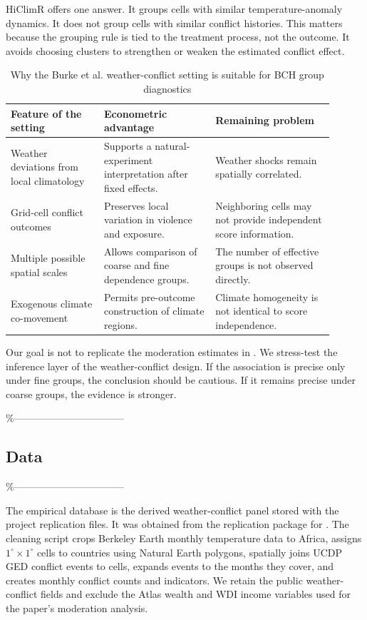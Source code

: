 \documentclass[
]{article}
\begin{document}
HiClimR offers one answer. It groups cells with similar
temperature-anomaly dynamics. It does not group cells with similar
conflict histories. This matters because the grouping rule is tied to
the treatment process, not the outcome. It avoids choosing clusters to
strengthen or weaken the estimated conflict effect.

\begin{table}[H]
\centering
\caption{Why the Burke et al. weather-conflict setting is suitable for BCH group diagnostics}
\label{tab:hbm-grouping}
\begin{tabular}{p{0.26\linewidth}p{0.31\linewidth}p{0.33\linewidth}}
\toprule
Feature of the setting & Econometric advantage & Remaining problem\\
\midrule
Weather deviations from local climatology & Supports a natural-experiment interpretation after fixed effects. & Weather shocks remain spatially correlated.\\
Grid-cell conflict outcomes & Preserves local variation in violence and exposure. & Neighboring cells may not provide independent score information.\\
Multiple possible spatial scales & Allows comparison of coarse and fine dependence groups. & The number of effective groups is not observed directly.\\
Exogenous climate co-movement & Permits pre-outcome construction of climate regions. & Climate homogeneity is not identical to score independence.\\
\bottomrule
\end{tabular}
\end{table}

Our goal is not to replicate the moderation estimates in
\citet{burke2024}. We stress-test the inference layer of the
weather-conflict design. If the association is precise only under fine
groups, the conclusion should be cautious. If it remains precise under
coarse groups, the evidence is stronger.

\%---------------------------------

\subsection{Data}

\%---------------------------------

The empirical database is the derived weather-conflict panel stored with
the project replication files. It was obtained from the replication
package for \citet{burke2024}. The cleaning script crops Berkeley Earth
monthly temperature data to Africa, assigns \(1^\circ\times1^\circ\)
cells to countries using Natural Earth polygons, spatially joins UCDP
GED conflict events to cells, expands events to the months they cover,
and creates monthly conflict counts and indicators. We retain the public
weather-conflict fields and exclude the Atlas wealth and WDI income
variables used for the paper's moderation analysis.
\end{document}
